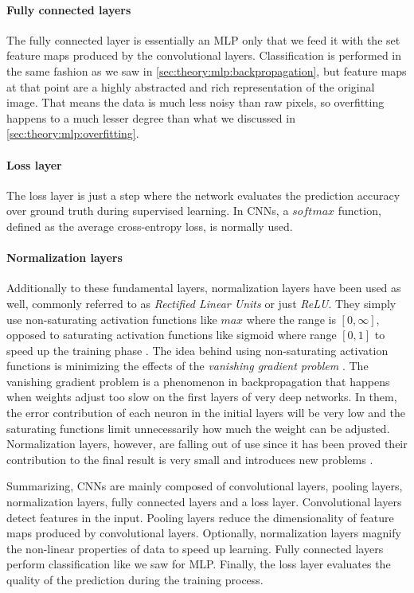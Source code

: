 \paragraph{Fully connected layers}
The fully connected layer is essentially an MLP only that we feed it with the set feature maps produced by the convolutional layers.
Classification is performed in the same fashion as we saw in \autoref{sec:theory:mlp:backpropagation}, but feature maps at that point are a highly abstracted and rich representation of the original image.
That means the data is much less noisy than raw pixels, so overfitting happens to a much lesser degree than what we discussed in \autoref{sec:theory:mlp:overfitting}.

\paragraph{Loss layer}
The loss layer is just a step where the network evaluates the prediction accuracy over ground truth during supervised learning.
In CNNs, a $softmax$ function, defined as the average cross-entropy loss, is normally used.

\paragraph{Normalization layers}
Additionally to these fundamental layers, normalization layers have been used as well, commonly referred to as \emph{Rectified Linear Units} or just \emph{ReLU}.
They simply use non-saturating activation functions like $max$ where the range is $[0,\infty]$, opposed to saturating activation functions like sigmoid where range $[0,1]$ to speed up the training phase \cite{Krizhevsky2012,Nair2010}.
The idea behind using non-saturating activation functions is minimizing the effects of the \emph{vanishing gradient problem} \cite{Socher2015}.
The vanishing gradient problem is a phenomenon in backpropagation that happens when weights adjust too slow on the first layers of very deep networks.
In them, the error contribution of each neuron in the initial layers will be very low and the saturating functions limit unnecessarily how much the weight can be adjusted.
Normalization layers, however, are falling out of use since it has been proved their contribution to the final result is very small and introduces new problems \cite{Lo2015}.

Summarizing, CNNs are mainly composed of convolutional layers, pooling layers, normalization layers, fully connected layers and a loss layer.
Convolutional layers detect features in the input.
Pooling layers reduce the dimensionality of feature maps produced by convolutional layers.
Optionally, normalization layers magnify the non-linear properties of data to speed up learning.
Fully connected layers perform classification like we saw for MLP.
Finally, the loss layer evaluates the quality of the prediction during the training process.


